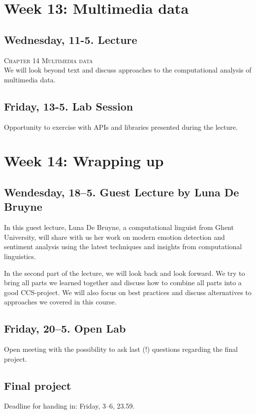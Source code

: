 


\section*{Week 13: Multimedia data}

\subsection*{Wednesday, 11-5. Lecture}
\textsc{ Chapter 14 Multimedia data}\\
We will look beyond text and discuss approaches to the computational analysis of multimedia data.


\subsection*{Friday, 13-5. Lab Session}
Opportunity to exercise with APIs and libraries presented during the lecture.




\section*{Week 14: Wrapping up}

\subsection*{Wendesday, 18--5. Guest Lecture by Luna De Bruyne}
In this guest lecture, Luna De Bruyne, a computational linguist from Ghent University, will share with us her work on modern emotion detection and sentiment analysis using the latest techniques and insights from computational linguistics.


In the second part of the lecture, we will look back and look forward. We try to bring all parts we learned together and discuss how to combine all parts into a good CCS-project. We will also focus on best practices and discuss alternatives to approaches we covered in this course. 



\subsection*{Friday, 20--5. Open Lab}
Open meeting with the possibility to ask last (!) questions regarding the final project.


\subsection*{Final project}
Deadline for handing in: Friday, 3--6, 23.59.
